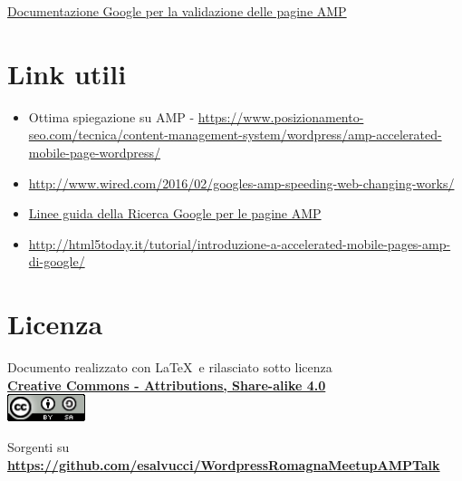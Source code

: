\documentclass[a4paper]{article}
\begin{document}
\href{https://www.ampproject.org/docs/guides/validate.html}{Documentazione Google per la validazione delle pagine AMP}

\newpage
\section{Link utili}
\begin{itemize}
    \item Ottima spiegazione su AMP - \href{https://www.posizionamento-seo.com/tecnica/content-management-system/wordpress/amp-accelerated-mobile-page-wordpress/}{https://www.posizionamento-seo.com/tecnica/content-management-system/wordpress/amp-accelerated-mobile-page-wordpress/}
    \item \href{http://www.wired.com/2016/02/googles-amp-speeding-web-changing-works/}{http://www.wired.com/2016/02/googles-amp-speeding-web-changing-works/}
    \item \href{https://support.google.com/webmasters/answer/6340290?hl=it}{Linee guida della Ricerca Google per le pagine AMP}
    \item \href{http://html5today.it/tutorial/introduzione-a-accelerated-mobile-pages-amp-di-google/}{http://html5today.it/tutorial/introduzione-a-accelerated-mobile-pages-amp-di-google/}
\end{itemize}

\section{Licenza}

Documento realizzato con \LaTeX\ e rilasciato sotto licenza\\
\textbf{\href{http://creativecommons.org/licenses/by-sa/4.0/}{Creative Commons - Attributions, Share-alike 4.0}}\\

\includegraphics[height=0.8cm]{images/cc.png}

Sorgenti su \textbf{\url{https://github.com/esalvucci/WordpressRomagnaMeetupAMPTalk}}
\end{document}
